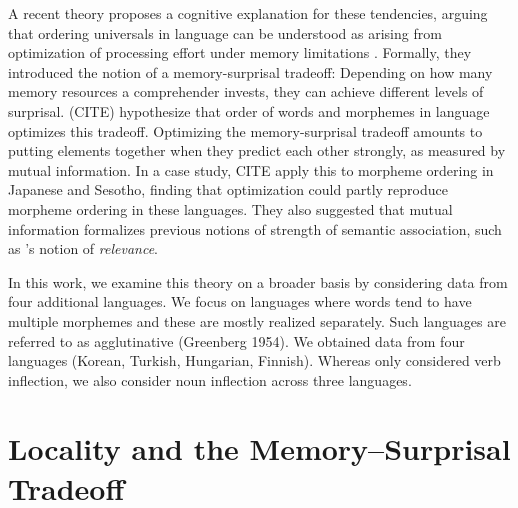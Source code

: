 \documentclass[11pt,letterpaper]{article}
\begin{document}
A recent theory proposes a cognitive explanation for these tendencies, arguing that ordering universals in language can be understood as arising from optimization of processing effort under memory limitations \citep{Hahn2020modeling}.
Formally, they introduced the notion of a memory-surprisal tradeoff: Depending on how many memory resources a comprehender invests, they can achieve different levels of surprisal.
(CITE) hypothesize that order of words and morphemes in language optimizes this tradeoff.
Optimizing the memory-surprisal tradeoff amounts to putting elements together when they predict each other strongly, as measured by mutual information.
In a case study, CITE apply this to morpheme ordering in Japanese and Sesotho, finding that optimization could partly reproduce morpheme ordering in these languages.
They also suggested that mutual information formalizes previous notions of strength of semantic association, such as \cite{bybee-morphology-1985}'s notion of \textit{relevance}.






In this work, we examine this theory on a broader basis by considering data from four additional languages.
We focus on languages where words tend to have multiple morphemes and these are mostly realized separately. Such languages are referred to as agglutinative (Greenberg 1954).
We obtained data from four languages (Korean, Turkish, Hungarian, Finnish).
Whereas \cite{Hahn2020modeling} only considered verb inflection, we also consider noun inflection across three languages.









\section{Locality and the Memory--Surprisal Tradeoff}
\end{document}
